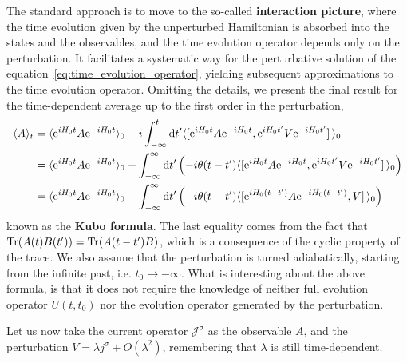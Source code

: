 The standard approach is to move to the so-called \textbf{interaction picture}, where the time evolution
given by the unperturbed Hamiltonian is absorbed into the states and the observables, and the time evolution
operator depends only on the perturbation. It facilitates a systematic way for the perturbative solution
of the equation~\eqref{eq:time_evolution_operator}, yielding subsequent approximations to the time evolution
operator. Omitting the details, we present the final result for the time-dependent
average up to the first order in the perturbation,
\begin{align}
    \langle A \rangle_t & = \langle \mathrm{e}^{i H_0 t}  A \mathrm{e}^{-i H_0 t} \rangle_0
    - i \int_{-\infty }^{t} \mathrm{d}t^{\prime} \langle \comm*{\mathrm{e}^{i H_0 t} A \mathrm{e}^{-i H_0 t}}
    {\mathrm{e}^{i H_0 t^{\prime} }V\mathrm{e}^{-i H_0 t^{\prime} }} \rangle_0 \nonumber         \\
                        & = \langle \mathrm{e}^{i H_0 t}  A \mathrm{e}^{-i H_0 t} \rangle_0
    + \int_{-\infty }^{\infty } \mathrm{d}t^{\prime} \left(-i \theta (t-t^{\prime} ) \langle \comm*{\mathrm{e}^{i H_0 t} A \mathrm{e}^{-i H_0 t}}
    {\mathrm{e}^{i H_0 t^{\prime} }V\mathrm{e}^{-i H_0 t^{\prime} }} \rangle_0 \right) \nonumber \\
                        & =\langle \mathrm{e}^{i H_0 t}  A \mathrm{e}^{-i H_0 t} \rangle_0
    + \int_{-\infty }^{\infty } \mathrm{d}t^{\prime} \left(-i \theta (t-t^{\prime} ) \langle \comm*{\mathrm{e}^{i H_0 (t-t^{\prime} )} A \mathrm{e}^{-i H_0 (t-t^{\prime} )}}
    {V} \rangle_0 \right)
    \label{eq:linear_response}
\end{align}
known as the \textbf{Kubo formula}. The last equality comes from the fact that
\(\Tr(A(t)B(t^{\prime} )) = \Tr(A(t-t^{\prime} )B)\), which is a consequence of the cyclic property of the trace. 
We also assume that the perturbation is turned adiabatically,
starting from the infinite past, i.e. \(t_0 \to -\infty \). What is interesting about the above formula, is that
it does not require the knowledge of neither full evolution operator \(U(t,t_0)\) nor the evolution operator
generated by the perturbation.

Let us now take the current operator \(\mathcal{J}^{\sigma }\) as the observable \(A\), and
the perturbation \(V = \lambda j^{\sigma } + O(\lambda^2)\), remembering that \(\lambda \) is still time-dependent.